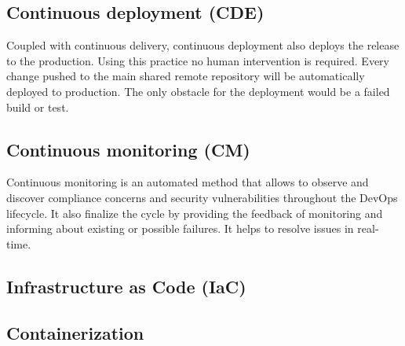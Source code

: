\subsection{Continuous deployment (CDE)} Coupled with continuous delivery, continuous deployment also deploys the release to the production. Using this practice no human intervention is required. Every change pushed to the main shared remote repository will be automatically deployed to production. The only obstacle for the deployment would be a failed build or test.

\subsection{Continuous monitoring (CM)} Continuous monitoring is an automated method that allows to observe and discover compliance concerns and security vulnerabilities throughout the DevOps lifecycle. It also finalize the cycle by providing the feedback of monitoring and informing about existing or possible failures. It helps to resolve issues in real-time.

\subsection{Infrastructure as Code (IaC)}

\subsection{Containerization}











